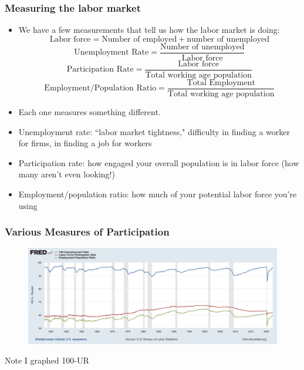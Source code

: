 \documentclass{beamer}
\begin{document}
    \begin{frame}
\frametitle[alignment=center]{Measuring the labor market}
\begin{itemize}
\item We have a few measurements that tell us how the labor market is doing:
$$\text{Labor force}=\text{Number of employed} + \text{number of unemployed}$$
$$\text{Unemployment Rate}=\frac{\text{Number of unemployed}}{\text{Labor force}}$$
$$\text{Participation Rate}=\frac{\text{Labor force}}{\text{Total working age population}}$$
$$\text{Employment/Population Ratio}=\frac{\text{Total Employment}}{\text{Total working age population}}$$
\item Each one measures something different.
\item Unemployment rate:  ``labor market tightness," difficulty in finding a worker for firms, in finding a job for workers
\item Participation rate:  how engaged your overall population is in labor force (how many aren't even looking!)
\item Employment/population ratio:  how much of your potential labor force you're using
\end{itemize}
\end{frame}

\begin{frame}
\frametitle[alignment=center]{Various Measures of Participation}
\begin{figure}
\includegraphics[scale=0.26]{Figures/L2_UI_LFP_EPRatio.png}
\end{figure}
Note I graphed 100-UR
\end{frame}
\end{document}
